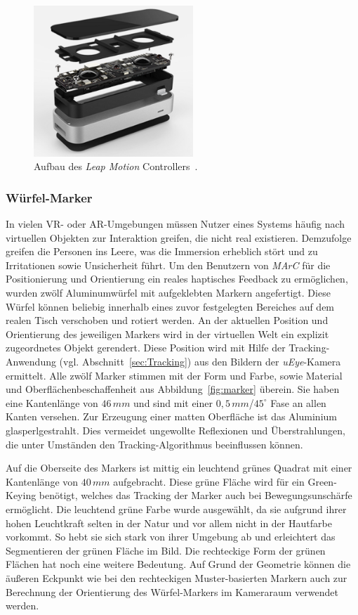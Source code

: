 \begin{figure}[H]
	\centering
	\includegraphics[width=6cm]{Bilder/leap-motion.png}			
		\caption[Aufbau des \emph{Leap Motion} Controllers]{Aufbau des \emph{Leap Motion} Controllers~\cite{website:LeapMotionBlog}.}
		\label{fig:leapMotion}
\end{figure}


\subsubsection{Würfel-Marker}\label{sec:WürfelMarker}%
In vielen VR- oder AR-Umgebungen müssen Nutzer eines Systems häufig nach virtuellen Objekten zur Interaktion greifen, die nicht real existieren. Demzufolge greifen die Personen ins Leere, was die Immersion erheblich stört und zu Irritationen sowie Unsicherheit führt.
Um den Benutzern von \textit{MArC} für die Positionierung und Orientierung ein reales haptisches Feedback zu ermöglichen, wurden zwölf Aluminumwürfel mit aufgeklebten Markern angefertigt. Diese Würfel können beliebig innerhalb eines zuvor festgelegten Bereiches auf dem realen Tisch verschoben und rotiert werden. An der aktuellen Position und Orientierung des jeweiligen Markers wird in der virtuellen Welt ein explizit zugeordnetes Objekt gerendert. Diese Position wird mit Hilfe der Tracking-Anwendung (vgl. Abschnitt~\ref{sec:Tracking}) aus den Bildern der \emph{uEye}-Kamera ermittelt.
Alle zwölf Marker stimmen mit der Form und Farbe, sowie Material und Oberflächenbeschaffenheit aus Abbildung~\ref{fig:marker} überein. Sie haben eine Kantenlänge von $46\,mm$ und sind mit einer $0,5\,mm$/$45^\circ$ Fase an allen Kanten versehen. Zur Erzeugung einer matten Oberfläche ist das Aluminium glasperlgestrahlt. Dies vermeidet ungewollte Reflexionen und Überstrahlungen, die unter Umständen den Tracking-Algorithmus beeinflussen können.

Auf die Oberseite des Markers ist mittig ein leuchtend grünes Quadrat mit einer Kantenlänge von $40\,mm$ aufgebracht. Diese grüne Fläche wird für ein Green-Keying benötigt, welches das Tracking der Marker auch bei Bewegungsunschärfe ermöglicht. Die leuchtend grüne Farbe wurde ausgewählt, da sie aufgrund ihrer hohen Leuchtkraft selten in der Natur und vor allem nicht in der Hautfarbe vorkommt. So hebt sie sich stark von ihrer Umgebung ab und erleichtert das Segmentieren der grünen Fläche im Bild. Die rechteckige Form der grünen Flächen hat noch eine weitere Bedeutung. Auf Grund der Geometrie können die äußeren Eckpunkt wie bei den rechteckigen Muster-basierten Markern auch zur Berechnung der Orientierung des Würfel-Markers im Kameraraum verwendet werden.

